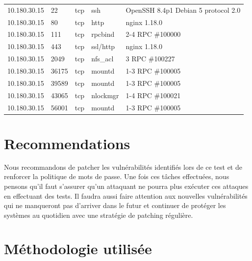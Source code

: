 \documentclass[french,paper=a4,oneside,captions=tableheading]{article}
\begin{document}
\begin{center}
\begin{longtable}{llllp{8.5cm}}
    10.180.30.15 & 22    & tcp & ssh          & OpenSSH 8.4p1 Debian 5 protocol 2.0 \\
    10.180.30.15 & 80    & tcp & http         & nginx 1.18.0    \\
    10.180.30.15 & 111   & tcp & rpcbind      & 2-4 RPC \#100000 \\
    10.180.30.15 & 443   & tcp & ssl/http     & nginx 1.18.0    \\
    10.180.30.15 & 2049  & tcp & nfs\_acl     & 3 RPC \#100227   \\
    10.180.30.15 & 36175 & tcp & mountd       & 1-3 RPC \#100005 \\
    10.180.30.15 & 39589 & tcp & mountd       & 1-3 RPC \#100005 \\
    10.180.30.15 & 43065 & tcp & nlockmgr     & 1-4 RPC \#100021 \\
    10.180.30.15 & 56001 & tcp & mountd       & 1-3 RPC \#100005 \\
\end{longtable} \end{center}















\section{Recommendations}

Nous recommandons de patcher les vulnérabilités identifiés lors de ce test et de renforcer la politique de mots de passe. Une fois ces tâches effectuées, nous pensons qu'il faut s'assurer qu'un attaquant ne pourra plus exécuter ces attaques en effectuant des tests. Il faudra aussi faire attention aux nouvelles vulnérabilités qui ne manqueront pas d'arriver dans le futur et continuer de protéger les systèmes au quotidien avec une stratégie de patching régulière.















\section{Méthodologie utilisée}
\end{document}
